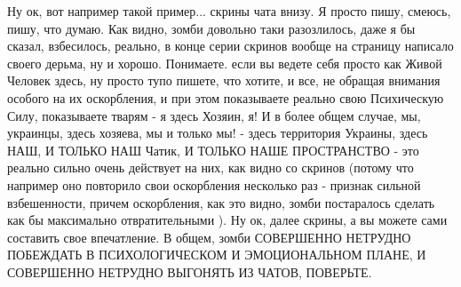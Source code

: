 Ну ок, вот например такой пример... скрины чата внизу. Я просто пишу, смеюсь,
пишу, что думаю. Как видно, зомби довольно таки разозлилось, даже я бы сказал,
взбесилось, реально, в конце серии скринов вообще на страницу написало своего
дерьма, ну и хорошо. Понимаете. если вы ведете себя просто как Живой Человек
здесь, ну просто тупо пишете, что хотите, и все, не обращая внимания особого на
их оскорбления, и при этом показываете реально свою Психическую Силу,
показываете тварям - я здесь Хозяин, я! И в более общем случае, мы, украинцы,
здесь хозяева, мы и только мы! - здесь территория Украины, здесь НАШ, И ТОЛЬКО
НАШ Чатик, И ТОЛЬКО НАШЕ ПРОСТРАНСТВО - это реально сильно очень действует на
них, как видно со скринов (потому что например оно повторило свои оскорбления
несколько раз - признак сильной взбешенности, причем оскорбления, как это
видно, зомби постаралось сделать как бы максимально отвратительными ). Ну ок,
далее скрины, а вы можете сами составить свое впечатление. В общем, зомби
СОВЕРШЕННО НЕТРУДНО ПОБЕЖДАТЬ В ПСИХОЛОГИЧЕСКОМ И ЭМОЦИОНАЛЬНОМ ПЛАНЕ, И
СОВЕРШЕННО НЕТРУДНО ВЫГОНЯТЬ ИЗ ЧАТОВ, ПОВЕРЬТЕ.

